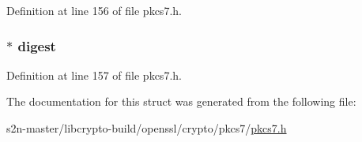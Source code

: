 Definition at line 156 of file pkcs7.\+h.

\subsubsection[{\texorpdfstring{digest}{digest}}]{ $\ast$ digest}\hypertarget{structpkcs7__digest__st_ac51bfebf9ca26f5d9cb1f71701a25024}{}\label{structpkcs7__digest__st_ac51bfebf9ca26f5d9cb1f71701a25024}


Definition at line 157 of file pkcs7.\+h.



The documentation for this struct was generated from the following file\+:\begin{DoxyCompactItemize}
\item 
s2n-\/master/libcrypto-\/build/openssl/crypto/pkcs7/\hyperlink{crypto_2pkcs7_2pkcs7_8h}{pkcs7.\+h}\end{DoxyCompactItemize}
